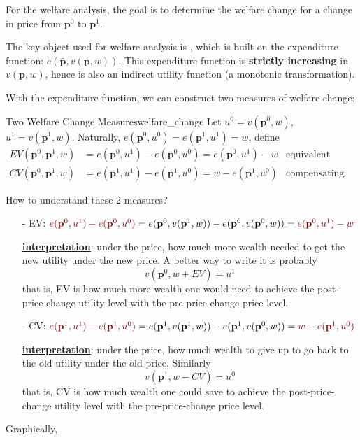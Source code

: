 For the welfare analysis, the goal is to determine the welfare change for a change in price from $\mathbf{p}^0$ to $\mathbf{p}^1$.

The key object used for welfare analysis is , which is built on the expenditure function: $e(\bar{\mathbf{p}},v(\mathbf{p},w))$. This expenditure function is \textbf{strictly increasing} in $v(\mathbf{p},w)$, hence is also an indirect utility function (a monotonic transformation).

With the expenditure function, we can construct two measures of welfare change:
\begin{definition}{Two Welfare Change Measures}{welfare_change}
    Let $u^0 = v(\mathbf{p}^0,w)$, $u^1 = v(\mathbf{p}^1,w)$. Naturally, $e(\mathbf{p}^0,u^0)=e(\mathbf{p}^1,u^1)=w$, define
    \begin{align*}
        EV(\mathbf{p}^0,\mathbf{p}^1,w) &=e(\mathbf{p}^0,u^1)-e(\mathbf{p}^0,u^0)=e(\mathbf{p}^0,u^1)-w & \text{equivalent variation}\\
        CV(\mathbf{p}^0,\mathbf{p}^1,w) &=e(\mathbf{p}^1,u^1)-e(\mathbf{p}^1,u^0)=w-e(\mathbf{p}^1,u^0) & \text{compensating variation}
    \end{align*}
\end{definition}

How to understand these 2 measures?

\begin{itemize}
    \item[-] EV: ${\color{red!55!black}e(\mathbf{p}^0,u^1)-e(\mathbf{p}^0,u^0)} = e(\mathbf{p}^0,v(\mathbf{p}^1,w))-e(\mathbf{p}^0,v(\mathbf{p}^0,w)) = {\color{red!55!black}e(\mathbf{p}^0,u^1)-w}$
    
    \underline{\textbf{interpretation}}: under the  price, how much more wealth needed to get the new utility under the new price. A better way to write it is probably
    $$
    v \left(\mathbf{p}^0, w+EV \right)=u^1
    $$
    that is, EV is how much more wealth one would need to achieve the post-price-change utility level with the pre-price-change price level.
    
    \item[-] CV: ${\color{red!55!black}e(\mathbf{p}^1,u^1)-e(\mathbf{p}^1,u^0)} = e(\mathbf{p}^1,v(\mathbf{p}^1,w))-e(\mathbf{p}^1,v(\mathbf{p}^0,w)) = {\color{red!55!black}w- e(\mathbf{p}^1,u^0)}$
    
    \underline{\textbf{interpretation}}: under the  price, how much wealth to give up to go back to the old utility under the old price. Similarly
    $$
    v \left(\mathbf{p}^1, w-CV \right)=u^0
    $$
    that is, CV is how much wealth one could save to achieve the post-price-change utility level with the pre-price-change price level.
\end{itemize}

Graphically, 